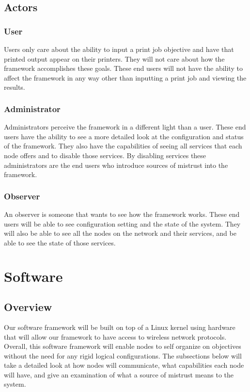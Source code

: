 \documentclass[draftclsnofoot, onecolumn, compsoc, 10pt]{IEEEtran}
\begin{document}
\subsection{Actors}
\subsubsection{User}
Users only care about the ability to input a print job objective and have that printed output appear on their printers. They will not care about how the framework accomplishes these goals. These end users will not have the ability to affect the framework in any way other than inputting a print job and viewing the results.

\subsubsection{Administrator}
Administrators perceive the framework in a different light than a user. These end users have the ability to see a more detailed look at the configuration and status of the framework. They also have the capabilities of seeing all services that each node offers and to disable those services. By disabling services these administrators are the end users who introduce sources of mistrust into the framework.

\subsubsection{Observer}
An observer is someone that wants to see how the framework works. These end users will be able to see configuration setting and the state of the system. They will also be able to see all the nodes on the network and their services, and be able to see the state of those services.

\section{Software}
\subsection{Overview}
Our software framework will be built on top of a Linux kernel using hardware that will allow our framework to have access to wireless network protocols. Overall, this software framework will enable nodes to self organize on objectives without the need for any rigid logical configurations. The subsections below will take a detailed look at how nodes will communicate, what capabilities each node will have, and give an examination of what a source of mistrust means to the system.
\end{document}
